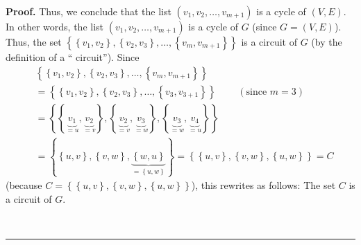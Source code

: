 \documentclass[numbers=enddot,12pt,final,onecolumn,notitlepage]{scrartcl}%
\theoremstyle{definition}
\newenvironment{proof}[1][Proof]{\noindent\textbf{#1.} }{\ \rule{0.5em}{0.5em}}
\newenvironment{verlong}{}{}
\begin{document}
\begin{verlong}
\begin{proof}
Thus, we conclude that the list $\left(  v_{1},v_{2},\ldots,v_{m+1}\right)  $
is a cycle of $\left(  V,E\right)  $. In other words, the list $\left(
v_{1},v_{2},\ldots,v_{m+1}\right)  $ is a cycle of $G$ (since $G=\left(
V,E\right)  $). Thus, the set $\left\{  \left\{  v_{1},v_{2}\right\}
,\left\{  v_{2},v_{3}\right\}  ,\ldots,\left\{  v_{m},v_{m+1}\right\}
\right\}  $ is a circuit of $G$ (by the definition of a \textquotedblleft
circuit\textquotedblright). Since%
\begin{align*}
&  \left\{  \left\{  v_{1},v_{2}\right\}  ,\left\{  v_{2},v_{3}\right\}
,\ldots,\left\{  v_{m},v_{m+1}\right\}  \right\} \\
&  =\left\{  \left\{  v_{1},v_{2}\right\}  ,\left\{  v_{2},v_{3}\right\}
,\ldots,\left\{  v_{3},v_{3+1}\right\}  \right\}  \ \ \ \ \ \ \ \ \ \ \left(
\text{since }m=3\right) \\
&  =\left\{  \left\{  \underbrace{v_{1}}_{=u},\underbrace{v_{2}}_{=v}\right\}
,\left\{  \underbrace{v_{2}}_{=v},\underbrace{v_{3}}_{=w}\right\}  ,\left\{
\underbrace{v_{3}}_{=w},\underbrace{v_{4}}_{=u}\right\}  \right\} \\
&  =\left\{  \left\{  u,v\right\}  ,\left\{  v,w\right\}
,\underbrace{\left\{  w,u\right\}  }_{=\left\{  u,w\right\}  }\right\}
=\left\{  \left\{  u,v\right\}  ,\left\{  v,w\right\}  ,\left\{  u,w\right\}
\right\}  =C
\end{align*}
(because $C=\left\{  \left\{  u,v\right\}  ,\left\{  v,w\right\}  ,\left\{
u,w\right\}  \right\}  $), this rewrites as follows: The set $C$ is a circuit
of $G$.


\end{proof}
\end{verlong}
\end{document}
